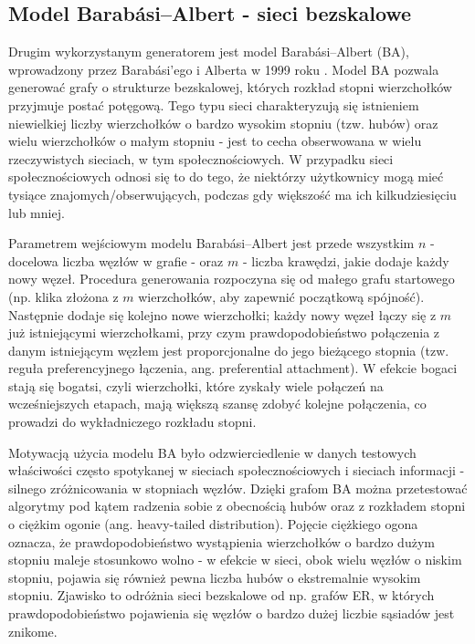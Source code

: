 \subsection{Model Barabási--Albert - sieci bezskalowe}
Drugim wykorzystanym generatorem jest model Barabási--Albert (BA), wprowadzony przez Barabási’ego i Alberta w 1999 roku \cite{barabasi1999emergence}. Model BA pozwala generować grafy o strukturze bezskalowej, których rozkład stopni wierzchołków przyjmuje postać potęgową. Tego typu sieci charakteryzują się istnieniem niewielkiej liczby wierzchołków o bardzo wysokim stopniu (tzw. hubów) oraz wielu wierzchołków o małym stopniu - jest to cecha obserwowana w wielu rzeczywistych sieciach, w tym społecznościowych. W przypadku sieci społecznościowych odnosi się to do tego, że niektórzy użytkownicy mogą mieć tysiące znajomych/obserwujących, podczas gdy większość ma ich kilkudziesięciu lub mniej.

Parametrem wejściowym modelu Barabási--Albert jest przede wszystkim $n$ - docelowa liczba węzłów w grafie - oraz $m$ - liczba krawędzi, jakie dodaje każdy nowy węzeł. Procedura generowania rozpoczyna się od małego grafu startowego (np. klika złożona z $m$ wierzchołków, aby zapewnić początkową spójność). Następnie dodaje się kolejno nowe wierzchołki; każdy nowy węzeł łączy się z $m$ już istniejącymi wierzchołkami, przy czym prawdopodobieństwo połączenia z danym istniejącym węzłem jest proporcjonalne do jego bieżącego stopnia (tzw. reguła preferencyjnego łączenia, ang. preferential attachment). W efekcie bogaci stają się bogatsi, czyli wierzchołki, które zyskały wiele połączeń na wcześniejszych etapach, mają większą szansę zdobyć kolejne połączenia, co prowadzi do wykładniczego rozkładu stopni.

Motywacją użycia modelu BA było odzwierciedlenie w danych testowych właściwości często spotykanej w sieciach społecznościowych i sieciach informacji - silnego zróżnicowania w stopniach węzłów. Dzięki grafom BA można przetestować algorytmy pod kątem radzenia sobie z obecnością hubów oraz z rozkładem stopni o ciężkim ogonie (ang. heavy-tailed distribution). Pojęcie ciężkiego ogona oznacza, że prawdopodobieństwo wystąpienia wierzchołków o bardzo dużym stopniu maleje stosunkowo wolno - w efekcie w sieci, obok wielu węzłów o niskim stopniu, pojawia się również pewna liczba hubów o ekstremalnie wysokim stopniu. Zjawisko to odróżnia sieci bezskalowe od np. grafów ER, w których prawdopodobieństwo pojawienia się węzłów o bardzo dużej liczbie sąsiadów jest znikome.

